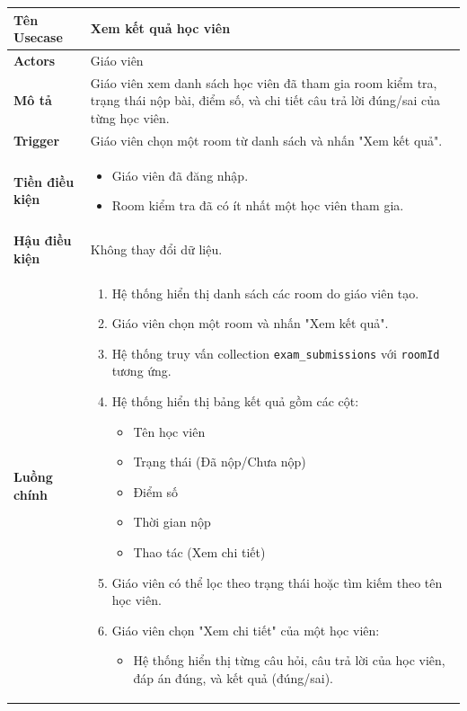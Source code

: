 \begin{longtable}{|p{}|p{}|}
\hline
\textbf{Tên Usecase} & \textbf{Xem kết quả học viên} \\
\hline
\textbf{Actors} & Giáo viên \\
\hline
\textbf{Mô tả} & 
Giáo viên xem danh sách học viên đã tham gia room kiểm tra, trạng thái nộp bài, điểm số, và chi tiết câu trả lời đúng/sai của từng học viên. \\
\hline
\textbf{Trigger} & Giáo viên chọn một room từ danh sách và nhấn "Xem kết quả". \\
\hline
\textbf{Tiền điều kiện} & 
\vspace{-\baselineskip}
\begin{itemize}[topsep=2pt, itemsep=0pt]
    \item Giáo viên đã đăng nhập.
    \item Room kiểm tra đã có ít nhất một học viên tham gia.
\end{itemize} \\
\hline
\textbf{Hậu điều kiện} & Không thay đổi dữ liệu. \\
\hline
\textbf{Luồng chính} &
\vspace{-\baselineskip}
\begin{enumerate}[topsep=2pt, itemsep=0pt]
    \item Hệ thống hiển thị danh sách các room do giáo viên tạo.
    \item Giáo viên chọn một room và nhấn "Xem kết quả".
    \item Hệ thống truy vấn collection \texttt{exam\_submissions} với \texttt{roomId} tương ứng.
    \item Hệ thống hiển thị bảng kết quả gồm các cột:
    \begin{itemize}[topsep=0pt, itemsep=0pt]
        \item Tên học viên
        \item Trạng thái (Đã nộp/Chưa nộp)
        \item Điểm số
        \item Thời gian nộp
        \item Thao tác (Xem chi tiết)
    \end{itemize}
    \item Giáo viên có thể lọc theo trạng thái hoặc tìm kiếm theo tên học viên.
    \item Giáo viên chọn "Xem chi tiết" của một học viên:
    \begin{itemize}[topsep=0pt, itemsep=0pt]
        \item Hệ thống hiển thị từng câu hỏi, câu trả lời của học viên, đáp án đúng, và kết quả (đúng/sai).

\end{itemize}
\end{enumerate}
\end{longtable}

